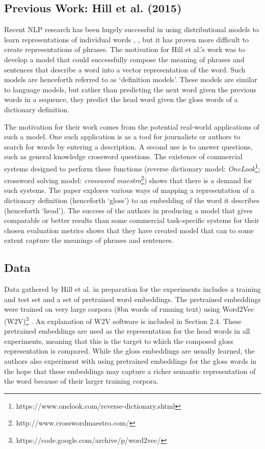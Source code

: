 \documentclass[11pt]{article}
\begin{document}
\begin{spacing}{1}
\section{Previous Work: Hill et al. (2015)}
Recent NLP research has been hugely successful in using distributional models to learn representations of individual words \cite{Turian:2010:WRS:1858681.1858721}, \cite{mikolov2013efficient}, but it has proven more difficult to create representations of phrases. The motivation for Hill et al.'s \citeyear{hill2015learning} work was to develop a model that could successfully compose the meaning of phrases and sentences that describe a word into a vector representation of the word. Such models are henceforth referred to as `definition models'. These models are similar to language models, but rather than predicting the next word given the previous words in a sequence, they predict the head word given the gloss words of a dictionary definition. 

The motivation for their work comes from the potential real-world applications of such a model. One such application is as a tool for journalists or authors to search for words by entering a description. A second use is to answer questions, such as general knowledge crossword questions. The existence of commercial systems designed to perform these functions (reverse dictionary model: \textit{OneLook}\footnote{https://www.onelook.com/reverse-dictionary.shtml}; crossword solving model: \textit{crossword maestro}\footnote{http://www.crosswordmaestro.com/}) shows that there is a demand for such systems. The paper explores various ways of mapping a representation of a dictionary definition (henceforth `gloss') to an embedding of the word it describes (henceforth `head'). The success of the authors in producing a model that gives comparable or better results than some commercial task-specific systems for their chosen evaluation metrics shows that they have created model that can to some extent capture the meanings of phrases and sentences. 


\subsection{Data}
Data gathered by Hill et al. \citeyear{hill2015learning} in preparation for the experiments includes a training and test set and a set of pretrained word embeddings. The pretrained embeddings were trained on very large corpora (8bn words of running text) using Word2Vec (W2V)\footnote{https://code.google.com/archive/p/word2vec/} \cite{mikolov2013efficient}. An explanation of W2V software is included in Section 2.4. These pretrained embeddings are used as the representation for the head words in all experiments, meaning that this is the target to which the composed gloss representation is compared. While the gloss embeddings are usually learned, the authors also experiment with using pretrained embeddings for the gloss words in the hope that these embeddings may capture a richer semantic representation of the word because of their larger training corpora.


\end{spacing}
\end{document}
